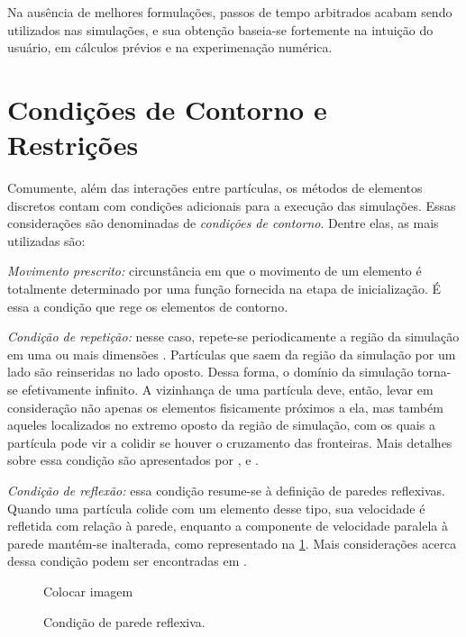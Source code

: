 Na ausência de melhores formulações, passos de tempo arbitrados acabam sendo utilizados nas simulações, e sua obtenção baseia-se fortemente na intuição do usuário, em cálculos prévios e na experimenação numérica.

\section{Condições de Contorno e Restrições} \label{sec:boundary_condition}

Comumente, além das interações entre partículas, os métodos de elementos discretos contam com condições adicionais para a execução das simulações. Essas considerações são denominadas de \textit{condições de contorno}. Dentre elas, as mais utilizadas são:
\begin{alineas}
\item \textit{Movimento prescrito:} circunstância em que o movimento de um elemento é totalmente determinado por uma função fornecida na etapa de inicialização. É essa a condição que rege os elementos de contorno.
\item \textit{Condição de repetição:} nesse caso, repete-se periodicamente a região da simulação em uma ou mais dimensões \cite[p. 15]{bib:computational_granular_dynamics}. Partículas que saem da região da simulação por um lado são reinseridas no lado oposto. Dessa forma, o domínio da simulação torna-se efetivamente infinito. A vizinhança de uma partícula deve, então, levar em consideração não apenas os elementos fisicamente próximos a ela, mas também aqueles localizados no extremo oposto da região de simulação, com os quais a partícula pode vir a colidir se houver o cruzamento das fronteiras. Mais detalhes sobre essa condição são apresentados por ,  e .
\item \textit{Condição de reflexão:} essa condição resume-se à definição de paredes reflexivas. Quando uma partícula colide com um elemento desse tipo, sua velocidade é refletida com relação à parede, enquanto a componente de velocidade paralela à parede mantém-se inalterada, como representado na \cref{fig:boundary_conditions:reflecting_boundary}. Mais considerações acerca dessa condição podem ser encontradas em .

\begin{figure}[h]
	\caption{Condição de parede reflexiva.}
	\centering
		\alert{Colocar imagem}
	\label{fig:boundary_conditions:reflecting_boundary}
\end{figure}


\end{alineas}

